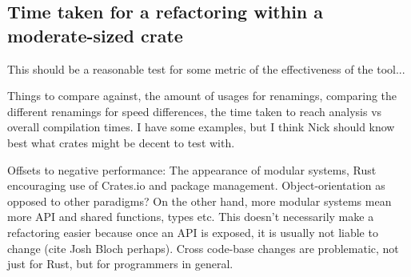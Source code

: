 \subsection{Time taken for a refactoring within a moderate-sized crate}
This should be a reasonable test for some metric of the effectiveness of the tool...

Things to compare against, the amount of usages for renamings, comparing the different renamings for speed differences, the time taken to reach analysis vs overall compilation times. 
I have some examples, but I think Nick should know best what crates might be decent to test with.

Offsets to negative performance:
The appearance of modular systems, Rust encouraging use of Crates.io and package management. Object-orientation as opposed to other paradigms? On the other hand, more modular systems mean more API and shared functions, types etc. This doesn't necessarily make a refactoring easier because once an API is exposed, it is usually not liable to change (cite Josh Bloch perhaps). Cross code-base changes are problematic, not just for Rust, but for programmers in general.

